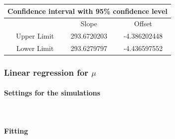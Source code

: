 \documentclass{article}
\begin{document}
                    \begin{table}[htbp]
                        \centering 
                        \begin{tabular}{|c|c|c|}
                            
                            \hline
                            \multicolumn{3}{|c|}{\bf Confidence interval with 95\% confidence level} \\
                            
                            \hline
                            \ & Slope & Offset\\
                            \hline
                            \ Upper Limit & 293.6720203 & -4.386202448 \\ 
                            \hline
                            \ Lower Limit & 293.6279797 & -4.436597552 \\ 
                            \hline
                        \end{tabular}
                        \label{table:CI_1_fitting_delta}
                    \end{table}
                    
            \subsubsection{Linear regression for $\mu$}
                \paragraph{Settings for the simulations} \hfill \\
                    
                \paragraph{Fitting} \hfill \\
\end{document}
